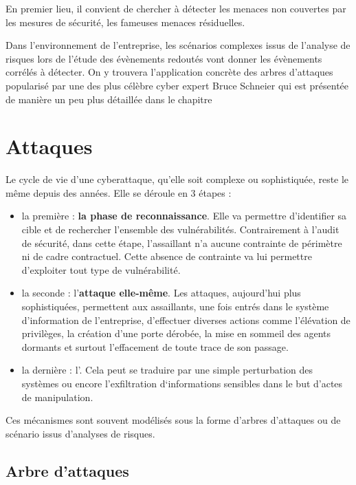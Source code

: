 En premier lieu, il convient de chercher à détecter les menaces non couvertes par les mesures de sécurité, les fameuses menaces résiduelles.

Dans l'environnement de l'entreprise, les scénarios complexes issus de l'analyse de risques lors de l'étude des évènements redoutés vont donner les évènements corrélés à détecter.
On y trouvera l'application concrète des arbres d'attaques popularisé par une des plus célèbre cyber expert Bruce Schneier \cite{schneier1999attack} qui est présentée de manière un peu plus détaillée dans le chapitre 



\section{Attaques}


Le cycle de vie d’une cyberattaque, qu’elle soit complexe ou sophistiquée, reste le même depuis des années. Elle se déroule en 3 étapes :
\begin{itemize}
  \item la première : \textbf{la phase de reconnaissance}. Elle va permettre d’identifier sa cible et de rechercher l’ensemble des vulnérabilités. Contrairement à l’audit de sécurité, dans cette étape, l’assaillant n’a aucune contrainte de périmètre ni de cadre contractuel. Cette absence de contrainte va lui permettre d’exploiter tout type de vulnérabilité.
  \item la seconde : l’\textbf{attaque elle-même}. Les attaques, aujourd’hui plus sophistiquées, permettent aux assaillants, une fois entrés dans le système d’information de l’entreprise, d’effectuer diverses actions comme l’élévation de privilèges, la création d’une porte dérobée, la mise en sommeil des agents dormants et surtout l’effacement de toute trace de son passage.
  \item  la dernière : l’. Cela peut se traduire par une simple perturbation des systèmes ou encore l’exfiltration d‘informations sensibles dans le but d’actes de manipulation.
\end{itemize}

Ces mécanismes sont souvent modélisés sous la forme d'arbres d'attaques ou de scénario issus d'analyses de risques.

\subsection{Arbre d'attaques} \label{ref_arbre_attaques}

